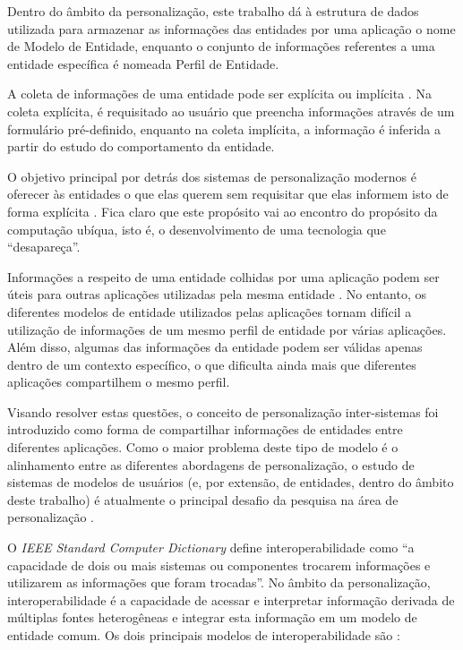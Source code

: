 Dentro do âmbito da personalização, este trabalho dá à estrutura de dados utilizada para armazenar as informações das entidades por uma aplicação o nome de Modelo de Entidade, enquanto o conjunto de informações referentes a uma entidade específica é nomeada Perfil de Entidade.

A coleta de informações de uma entidade pode ser explícita ou implícita \cite{viviani10}. Na coleta explícita, é requisitado ao usuário que preencha informações através de um formulário pré-definido, enquanto na coleta implícita, a informação é inferida a partir do estudo do comportamento da entidade.

O objetivo principal por detrás dos sistemas de personalização modernos é oferecer às entidades o que elas querem sem requisitar que elas informem isto de forma explícita \cite{mulvenna00}. Fica claro que este propósito vai ao encontro do propósito da computação ubíqua, isto é, o desenvolvimento de uma tecnologia que ``desapareça''.

Informações a respeito de uma entidade colhidas por uma aplicação podem ser úteis para outras aplicações utilizadas pela mesma entidade \cite{viviani10}. No entanto, os diferentes modelos de entidade utilizados pelas aplicações tornam difícil a utilização de informações de um mesmo perfil de entidade por várias aplicações. Além disso, algumas das informações da entidade podem ser válidas apenas dentro de um contexto específico, o que dificulta ainda mais que diferentes aplicações compartilhem o mesmo perfil.

Visando resolver estas questões, o conceito de personalização inter-sistemas foi introduzido \cite{niederee04} como forma de compartilhar informações de entidades entre diferentes aplicações. Como o maior problema deste tipo de modelo é o alinhamento entre as diferentes abordagens de personalização, o estudo de sistemas de modelos de usuários (e, por extensão, de entidades, dentro do âmbito deste trabalho) é atualmente o principal desafio da pesquisa na área de personalização \cite{viviani10}.

O {\em IEEE Standard Computer Dictionary} \cite{ieeedict} define interoperabilidade como ``a capacidade de dois ou mais sistemas ou componentes trocarem informações e utilizarem as informações que foram trocadas''. No âmbito da personalização, interoperabilidade é a capacidade de acessar e interpretar informação derivada de múltiplas fontes heterogêneas e integrar esta informação em um modelo de entidade comum. Os dois principais modelos de interoperabilidade são \cite{carmagnola09}: 

